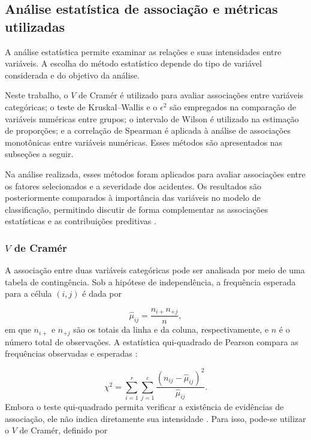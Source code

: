 \documentclass[12pt]{article}
\begin{document}
\subsection{Análise estatística de associação e métricas utilizadas}

A análise estatística permite examinar as relações e suas intensidades entre variáveis. A escolha do método estatístico depende do tipo de variável considerada e do objetivo da análise.

Neste trabalho, o $V$ de Cramér é utilizado para avaliar associações entre variáveis categóricas; o teste de Kruskal--Wallis e o $\epsilon^2$ são empregados na comparação de variáveis numéricas entre grupos; o intervalo de Wilson é utilizado na estimação de proporções; e a correlação de Spearman é aplicada à análise de associações monotônicas entre variáveis numéricas. Esses métodos são apresentados nas subseções a seguir.

Na análise realizada, esses métodos foram aplicados para avaliar associações entre os fatores selecionados e a severidade dos acidentes. Os resultados são posteriormente comparados à importância das variáveis no modelo de classificação, permitindo discutir de forma complementar as associações estatísticas e as contribuições preditivas \cite{agresti2007,kruskal1952,brown2001interval,spearman1904}.

\subsubsection{$V$ de Cramér}

A associação entre duas variáveis categóricas pode ser analisada por meio de uma tabela de contingência. Sob a hipótese de independência, a frequência esperada para a célula $(i,j)$ é dada por \cite{agresti2007}

\begin{equation}
    \hat{\mu}_{ij} = \frac{n_{i+}n_{+j}}{n},
\end{equation}
em que $n_{i+}$ e $n_{+j}$ são os totais da linha e da coluna, respectivamente, e $n$ é o número total de observações. A estatística qui-quadrado de Pearson compara as frequências observadas e esperadas \cite{agresti2007}:

\begin{equation}
    \chi^2 = \sum_{i=1}^{r}\sum_{j=1}^{c}\frac{(n_{ij}-\hat{\mu}_{ij})^2}{\hat{\mu}_{ij}}.
\end{equation}
Embora o teste qui-quadrado permita verificar a existência de evidências de associação, ele não indica diretamente sua intensidade \cite{agresti2007}. Para isso, pode-se utilizar o $V$ de Cramér, definido por \cite{navarro2015learning}
\end{document}
